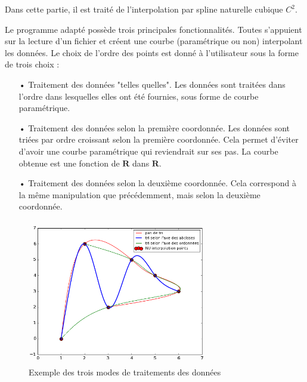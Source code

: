 \documentclass[a4paper,12pt]{article} %
\begin{document}
Dans cette partie, il est traité de l'interpolation par spline naturelle cubique $C^{2}$.

Le programme adapté possède trois principales fonctionnalités. Toutes s'appuient sur la lecture d'un fichier et créent une courbe (paramétrique ou non) interpolant les données.
Le choix de l'ordre des points est donné à l'utilisateur sous la forme de trois choix : 


\begin{itemize}
    \item[•] Traitement des données "telles quelles". Les données sont traitées dans l'ordre dans lesquelles elles ont été fournies, sous forme de courbe paramétrique.
    \item[•] Traitement des données selon la première coordonnée. Les données sont triées par ordre croissant selon la première coordonnée. Cela permet d'éviter d'avoir une courbe paramétrique qui reviendrait sur ses pas. La courbe obtenue est une fonction de $\mathbf{R}$ dans $\mathbf{R}$.
    \item[•] Traitement des données selon la deuxième coordonnée. Cela correspond à la même manipulation que précédemment, mais selon la deuxième coordonnée.
\end{itemize}





\begin{figure}[h]
\begin{center}
\includegraphics[width=8cm]{tache0.png} 
\end{center}
\caption{Exemple des trois modes de traitements des données}
\end{figure}
\end{document}

